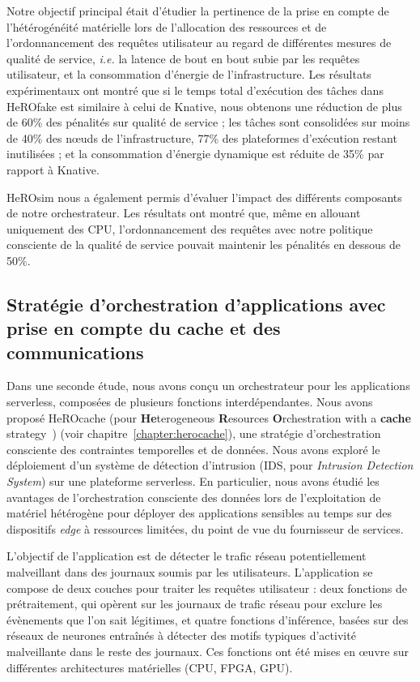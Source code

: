 Notre objectif principal était d'étudier la pertinence de la prise en compte de l'hétérogénéité matérielle lors de l'allocation des ressources et de l'ordonnancement des requêtes utilisateur au regard de différentes mesures de qualité de service, \textit{i.e.} la latence de bout en bout subie par les requêtes utilisateur, et la consommation d'énergie de l'infrastructure. Les résultats expérimentaux ont montré que si le temps total d'exécution des tâches dans HeROfake est similaire à celui de Knative, nous obtenons une réduction de plus de 60\% des pénalités sur qualité de service ; les tâches sont consolidées sur moins de 40\% des nœuds de l'infrastructure, 77\% des plateformes d'exécution restant inutilisées ; et la consommation d'énergie dynamique est réduite de 35\% par rapport à Knative.

HeROsim nous a également permis d'évaluer l'impact des différents composants de notre orchestrateur. Les résultats ont montré que, même en allouant uniquement des \gls{CPU}, l'ordonnancement des requêtes avec notre politique consciente de la qualité de service pouvait maintenir les pénalités en dessous de 50\%.

\subsection{Stratégie d'orchestration d'applications avec prise en compte du cache et des communications}

Dans une seconde étude, nous avons conçu un orchestrateur pour les applications serverless, composées de plusieurs fonctions interdépendantes. Nous avons proposé HeROcache (pour \textbf{He}terogeneous \textbf{R}esources \textbf{O}rchestration with a \textbf{cache} strategy~\cite{herocache}) (voir chapitre~\ref{chapter:herocache}), une stratégie d'orchestration consciente des contraintes temporelles et de données. Nous avons exploré le déploiement d'un système de détection d'intrusion (\gls{IDS}, pour \textit{Intrusion Detection System}) sur une plateforme serverless. En particulier, nous avons étudié les avantages de l'orchestration consciente des données lors de l'exploitation de matériel hétérogène pour déployer des applications sensibles au temps sur des dispositifs \textit{edge} à ressources limitées, du point de vue du fournisseur de services.

L'objectif de l'application est de détecter le trafic réseau potentiellement malveillant dans des journaux soumis par les utilisateurs. L'application se compose de deux couches pour traiter les requêtes utilisateur : deux fonctions de prétraitement, qui opèrent sur les journaux de trafic réseau pour exclure les évènements que l'on sait légitimes, et quatre fonctions d'inférence, basées sur des réseaux de neurones entraînés à détecter des motifs typiques d'activité malveillante dans le reste des journaux. Ces fonctions ont été mises en œuvre sur différentes architectures matérielles (\gls{CPU}, \gls{FPGA}, \gls{GPU}).

